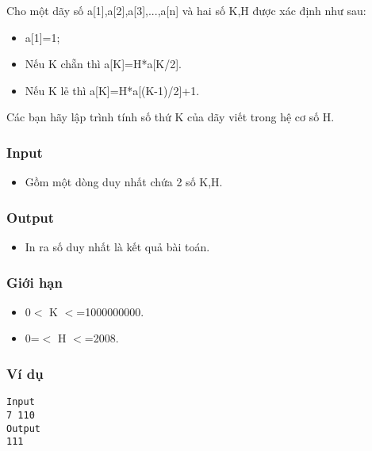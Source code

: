 



   Cho một dãy số a[1],a[2],a[3],...,a[n] và hai số K,H được xác định như sau:  
\begin{itemize}
	\item     a[1]=1;   
	\item     Nếu K chẵn thì a[K]=H*a[K/2].   
	\item     Nếu K lẻ thì a[K]=H*a[(K-1)/2]+1.   
\end{itemize}

   Các bạn hãy lập trình tính số thứ K của dãy viết trong hệ cơ số H.  

\subsubsection{   Input  }
\begin{itemize}
	\item     Gồm một dòng duy nhất chứa 2 số K,H.   
\end{itemize}

\subsubsection{   Output  }
\begin{itemize}
	\item     In ra số duy nhất là kết quả bài toán.   
\end{itemize}

\subsubsection{   Giới hạn  }
\begin{itemize}
	\item     0$<$ K $<$=1000000000.   
	\item     0=$<$ H $<$=2008.   
\end{itemize}

\subsubsection{   Ví dụ  }
\begin{verbatim}
Input
7 110
Output
111
\end{verbatim}
